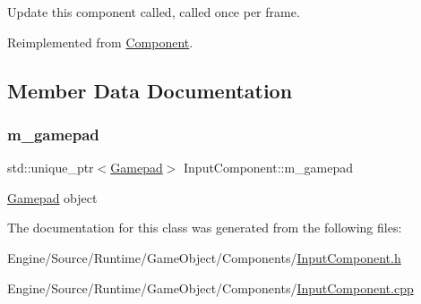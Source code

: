 Update this component called, called once per frame. 

Reimplemented from \mbox{\hyperlink{class_component_a8afb7c9504f763728bfedf642cfc5f43}{Component}}.



\subsection{Member Data Documentation}
\mbox{\label{class_input_component_a73abf6fc0132814d3cdca33aa5d3dfba}} 
\subsubsection{\texorpdfstring{m\+\_\+gamepad}{m\_gamepad}}
{\footnotesize\ttfamily std\+::unique\+\_\+ptr$<$\mbox{\hyperlink{class_gamepad}{Gamepad}}$>$ Input\+Component\+::m\+\_\+gamepad}

\mbox{\hyperlink{class_gamepad}{Gamepad}} object 

The documentation for this class was generated from the following files\+:\begin{DoxyCompactItemize}
\item 
Engine/\+Source/\+Runtime/\+Game\+Object/\+Components/\mbox{\hyperlink{_input_component_8h}{Input\+Component.\+h}}\item 
Engine/\+Source/\+Runtime/\+Game\+Object/\+Components/\mbox{\hyperlink{_input_component_8cpp}{Input\+Component.\+cpp}}\end{DoxyCompactItemize}

